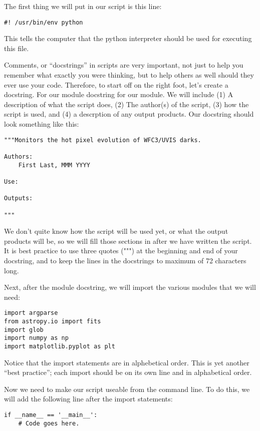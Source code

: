 The first thing we will put in our script is this line:

\begin{verbatim}
#! /usr/bin/env python
\end{verbatim}

This tells the computer that the python interpreter should be used for executing this file.

Comments, or ``docstrings'' in scripts are very important, not just to help you 
remember what exactly you were thinking, but to help others as well should 
they ever use your code. Therefore, to start off on the right foot, let's create 
a docstring.  For our module docstring for our module.  We will include (1) A description
of what the script does, (2) The author(s) of the script, (3) how the script is used,
and (4) a descrption of any output products.  Our docstring should look something like
this:

\begin{verbatim}
"""Monitors the hot pixel evolution of WFC3/UVIS darks.

Authors:
    First Last, MMM YYYY

Use:

Outputs:

"""
\end{verbatim}

We don't quite know how the script will be used yet, or what the output products
will be, so we will fill those sections in after we have written the script.  It is
best practice to use three quotes (""") at the beginning and end of your docstring, and
to keep the lines in the docstrings to maximum of 72 characters long.

Next, after the module docstring, we will import the various modules that we will need:

\begin{verbatim}
import argparse
from astropy.io import fits
import glob
import numpy as np
import matplotlib.pyplot as plt
\end{verbatim}

Notice that the import statements are in alphebetical order.  This is yet another 
``best practice''; each import should be on its own line and in alphabetical order.

Now we need to make our script useable from the command line.  To do this, we will add
the following line after the import statements:

\begin{verbatim}
if __name__ == '__main__':
    # Code goes here.
\end{verbatim}

